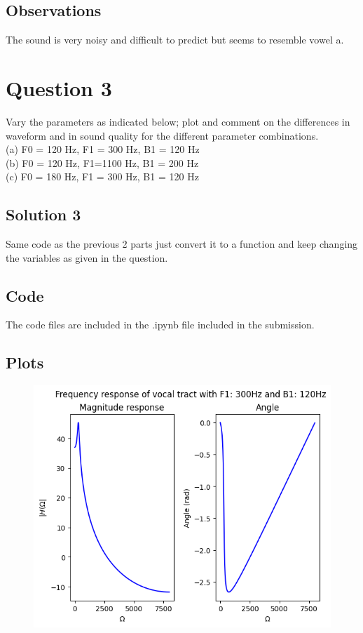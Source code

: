 \documentclass{article}
\begin{document}
\subsection{Observations}
The sound is very noisy and difficult to predict but seems to resemble vowel a.


\section{Question 3}

Vary the parameters as indicated below; plot and comment on the differences in waveform and in sound quality for the different parameter combinations.\\
(a) F0 = 120 Hz, F1 = 300 Hz, B1 = 120 Hz\\
(b) F0 = 120 Hz, F1=1100 Hz, B1 = 200 Hz\\
(c) F0 = 180 Hz, F1 = 300 Hz, B1 = 120 Hz\\

\subsection{Solution 3}
Same code as the previous 2 parts just convert it to a function and keep changing the variables as given in the question.

\subsection{Code}
The code files are included in the .ipynb file included in the submission.

\subsection{Plots}


\begin{figure}[H]
\begin{center}
\includegraphics[scale = 0.5]{Q3_A.png}
\end{center}
\end{figure}
\end{document}
